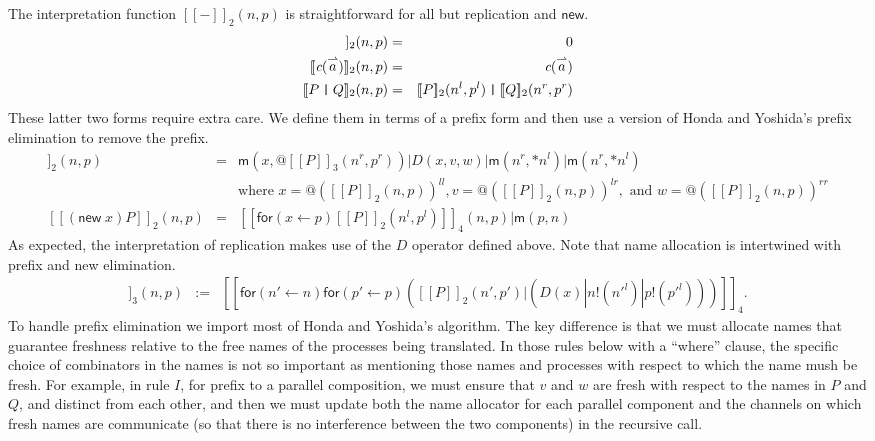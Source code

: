 \documentclass[submission,copyright,creativecommons]{eptcs}
\makeatletter
\newcommand{\new}{\mathsf{new}}
\newcommand{\ldb}{[\![}
\newcommand{\rdb}{]\!]}
\newcommand{\id}[1]{\texttt{#1}}
\newcommand{\pzero}{\mathbin{0}}
\newcommand{\juxtap}{\mathbin{\id{|}}}
\newcommand{\binpar}[2]{#1 | #2}
\newcommand{\outputp}[2]{#1!(#2)}
\newcommand{\prefix}[3]{\mathsf{for}(#2 \leftarrow #1) #3}
\newcommand{\quotep}[1]{\mathsf{@}#1}
\newcommand{\meaningof}[1]{\ldb #1 \rdb}
\newcommand{\vect}[1]{\stackrel{\rightharpoonup}{#1}}
\theoremstyle{definition}
\theoremstyle{remark}
\theoremstyle{remark}
\makeatother
\begin{document}
The interpretation function $\meaningof{-}_2(n, p)$ is straightforward
for all but replication and $\mathsf{new}$.
\begin{eqnarray*}
\meaningof{\pzero}_2 (n,p)
      & = &
       \pzero \\
    \meaningof{\emph{c}(\vect{a})}_2 (n,p) 
      & = & 
      \emph{c}(\vect{a})\\ %
    \meaningof{P \juxtap Q}_2 (n,p) 
      & = & 
    \meaningof{P}_2 (n^l, p^l)
         \juxtap \meaningof{Q}_2 (n^r, p^r)  
\end{eqnarray*}
These latter two forms require extra care. We define them in terms of
a prefix form and then use a version of Honda and Yoshida's prefix elimination
to remove the prefix.
\begin{eqnarray*}
    \meaningof{\mathsf{*} P}_2 (n,p)
          & = & \binpar{\mathsf{m}(x, \quotep{\meaningof{P}_3(n^r,p^r)})}
                  {\binpar{D(x,v,w)}
                    {\binpar{\mathsf{m}(n^r, *n^l)}{\mathsf{m}(n^r, *n^l)}}} \\
                  & & \mbox{where } 
                      x = @(\meaningof{P}_2(n,p))^{ll}, 
                      v = @(\meaningof{P}_2(n,p))^{lr}, \mbox{ and }
                      w = @(\meaningof{P}_2(n,p))^{rr} \\
    \meaningof{(\new \; x ) P}_2 (n, p) 
          & = & 
         \binpar{\meaningof{\prefix{p}{x}{{\meaningof{P}_2 ( n^l, p^l )}}}_4(n, p)}{\mathsf{m}(p, n)}
\end{eqnarray*}
As expected, the interpretation of replication makes use of the $D$
operator defined above. Note that name allocation is intertwined with
prefix and new elimination.
\begin{eqnarray*}
  \meaningof{P}_3(n, p) 
    & := & 
      \meaningof{\prefix{n}{n'}{\prefix{p}{p'}{(\binpar{\meaningof{P}_2(n',p')}
        {(\binpar{D(x)}{\binpar{\outputp{n}{n'^l}}{\outputp{p}{p'^l}}})})}}}_4. \end{eqnarray*}
To handle prefix elimination we import most of Honda and Yoshida's
algorithm. The key difference is that we must allocate names that
guarantee freshness relative to the free names of the processes being
translated. In those rules below with a ``where'' clause, the specific
choice of combinators in the names is not so important as mentioning
those names and processes with respect to which the name mush be fresh.
For example, in rule $I$, for prefix to a parallel
composition, we must ensure that $v$ and $w$ are fresh with respect to
the names in $P$ and $Q$, and distinct from each other, and then we
must update both the name allocator for each parallel component and
the channels on which fresh names are communicate (so that there is no
interference between the two components) in the recursive call. 
\end{document}
